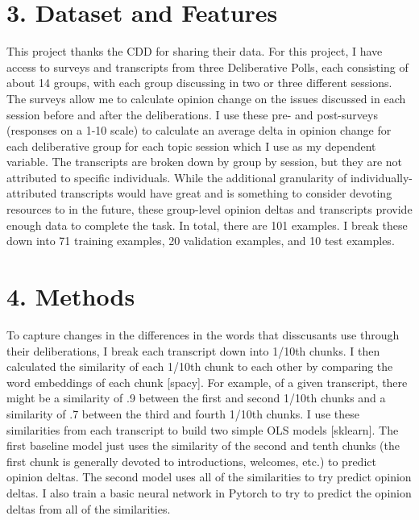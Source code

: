 \documentclass[11pt,]{article}
\begin{document}
\hypertarget{dataset-and-features}{%
\section{3. Dataset and Features}\label{dataset-and-features}}

This project thanks the CDD for sharing their data. For this project, I
have access to surveys and transcripts from three Deliberative Polls,
each consisting of about 14 groups, with each group discussing in two or
three different sessions. The surveys allow me to calculate opinion
change on the issues discussed in each session before and after the
deliberations. I use these pre- and post-surveys (responses on a 1-10
scale) to calculate an average delta in opinion change for each
deliberative group for each topic session which I use as my dependent
variable. The transcripts are broken down by group by session, but they
are not attributed to specific individuals. While the additional
granularity of individually-attributed transcripts would have great and
is something to consider devoting resources to in the future, these
group-level opinion deltas and transcripts provide enough data to
complete the task. In total, there are 101 examples. I break these down
into 71 training examples, 20 validation examples, and 10 test examples.

\hypertarget{methods}{%
\section{4. Methods}\label{methods}}

To capture changes in the differences in the words that disscusants use
through their deliberations, I break each transcript down into 1/10th
chunks. I then calculated the similarity of each 1/10th chunk to each
other by comparing the word embeddings of each chunk {[}spacy{]}. For
example, of a given transcript, there might be a similarity of .9
between the first and second 1/10th chunks and a similarity of .7
between the third and fourth 1/10th chunks. I use these similarities
from each transcript to build two simple OLS models {[}sklearn{]}. The
first baseline model just uses the similarity of the second and tenth
chunks (the first chunk is generally devoted to introductions, welcomes,
etc.) to predict opinion deltas. The second model uses all of the
similarities to try predict opinion deltas. I also train a basic neural
network in Pytorch to try to predict the opinion deltas from all of the
similarities.
\end{document}
